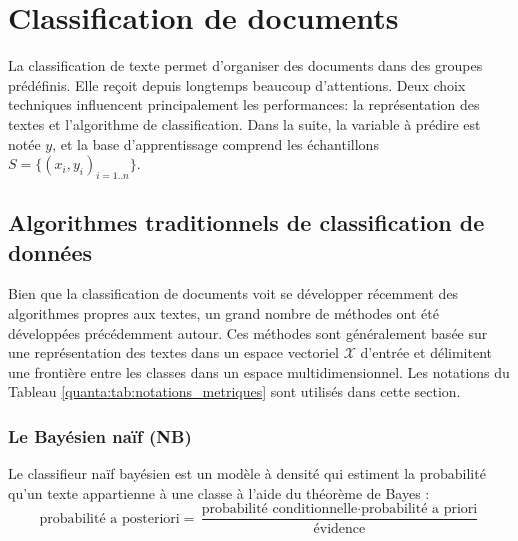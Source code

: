 \section{Classification de documents}
\label{sec:sensresultat:biblio_classif}

La classification de texte permet d'organiser des documents dans des groupes prédéfinis. Elle reçoit depuis longtemps beaucoup d'attentions. Deux choix techniques influencent principalement les performances: la représentation des textes et l'algorithme de classification. Dans la suite, la variable à prédire est notée $y$, et la base d'apprentissage comprend les échantillons $S = \lbrace (x_i, y_i)_{i=1..n} \rbrace$.

\subsection{Algorithmes traditionnels de classification de données}
Bien que la classification de documents voit se développer récemment des algorithmes propres aux textes, un grand nombre de méthodes ont été développées précédemment autour. Ces méthodes sont généralement basée sur une représentation  des textes dans un espace vectoriel $\mathcal{X}$ d'entrée et délimitent une frontière entre les classes dans un espace multidimensionnel. Les notations du Tableau \ref{quanta:tab:notations_metriques} sont utilisés dans cette section. 

\subsubsection{Le Bayésien naïf (NB)}
Le classifieur naïf bayésien \citep{duda1973patternclass} est  un modèle à densité qui estiment la probabilité qu'un texte appartienne à une classe à l'aide du théorème de Bayes \citep{raschka2014naivebayes}:
\begin{equation}
\text{probabilité a posteriori} = \frac{\text{probabilité conditionnelle} \cdot \text{probabilité a priori}}{\text{évidence}}
\end{equation}

